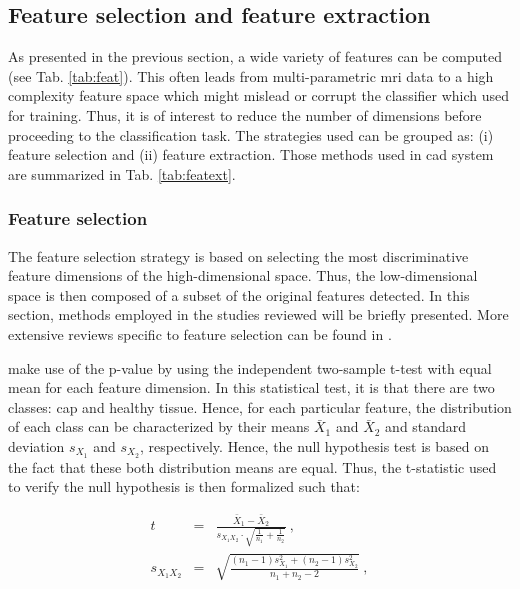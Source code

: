 \subsection{Feature selection and feature extraction} \label{subsec:featureselectionextraction}

As presented in the previous section, a wide variety of features can be computed (see Tab. \ref{tab:feat}). This often leads from multi-parametric \ac{mri} data to a high complexity feature space which might mislead or corrupt the classifier which used for training. Thus, it is of interest to reduce the number of dimensions before proceeding to the classification task. The strategies used can be grouped as: (i) feature selection and (ii) feature extraction. Those methods used in \ac{cad} system are summarized in Tab. \ref{tab:featext}.

\subsubsection{Feature selection}\label{subsubsec:featsel}

The feature selection strategy is based on selecting the most discriminative feature dimensions of the high-dimensional space. Thus, the low-dimensional space is then composed of a subset of the original features detected. In this section, methods employed in the studies reviewed will be briefly presented. More extensive reviews specific to feature selection can be found in \cite{Saeys2007}.

\cite{Niaf2011,Niaf2012} make use of the p-value by using the independent two-sample t-test with equal mean for each feature dimension. In this statistical test, it is that there are two classes: \ac{cap} and healthy tissue. Hence, for each particular feature, the distribution of each class can be characterized by their means $\bar{X}_1$ and $\bar{X}_2$ and standard deviation $s_{X_1}$ and $s_{X_2}$, respectively. Hence, the null hypothesis test is based on the fact that these both distribution means are equal. Thus, the t-statistic used to verify the null hypothesis is then formalized such that:

\begin{eqnarray}
t & = & \frac{\bar {X}_1 - \bar{X}_2}{s_{X_1X_2} \cdot \sqrt{\frac{1}{n_1}+\frac{1}{n_2}}} \ , \label{eq:tstat} \\
s_{X_1X_2} & = & \sqrt{\frac{(n_1-1)s_{X_1}^2+(n_2-1)s_{X_2}^2}{n_1+n_2-2}} \ , \nonumber
\end{eqnarray}

